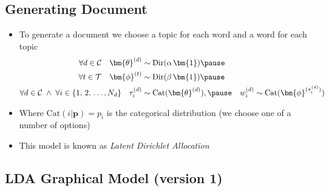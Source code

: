 \begin{slide}
\section[-1]{Generating Document}

\begin{PauseHighLight}
  \begin{itemize}
  \item To generate a document we choose a topic for each word and a
    word for each topic\pause
    \begin{align*}
    \forall d\in\mathcal{C} \quad \bm{\theta}^{(d)}&\sim
    \mathrm{Dir}(\alpha\,\bm{1})\pause &&\\
    \forall t\in\mathcal{T} \quad \bm{\phi}^{(t)}&\sim
    \mathrm{Dir}(\beta\,\bm{1})\pause && \\
    \forall d\in\mathcal{C} \; \wedge\; \forall i\in\{1,\,2,\,\ldots, N_d\}
    \quad \tau^{(d)}_i &\sim \mathrm{Cat}(\bm{\theta}^{(d)}),\pause &
    w^{(d)}_i &\sim \mathrm{Cat}(\bm{\phi}^{(\tau^{(d)}_i)})
  \end{align*}
\item Where $\mathrm{Cat}(i|\bm{p}) = p_i$ is the categorical
  distribution (we choose one of a number of options)\pause
\item This model is known as \emph{Latent Dirichlet Allocation}\pause
  \end{itemize}
\end{PauseHighLight}

\end{slide}



\begin{slide}
\section[-2]{LDA Graphical Model (version 1)}

\pb\pause{}
\begin{center}
  \pause
\end{center}
\end{slide}


